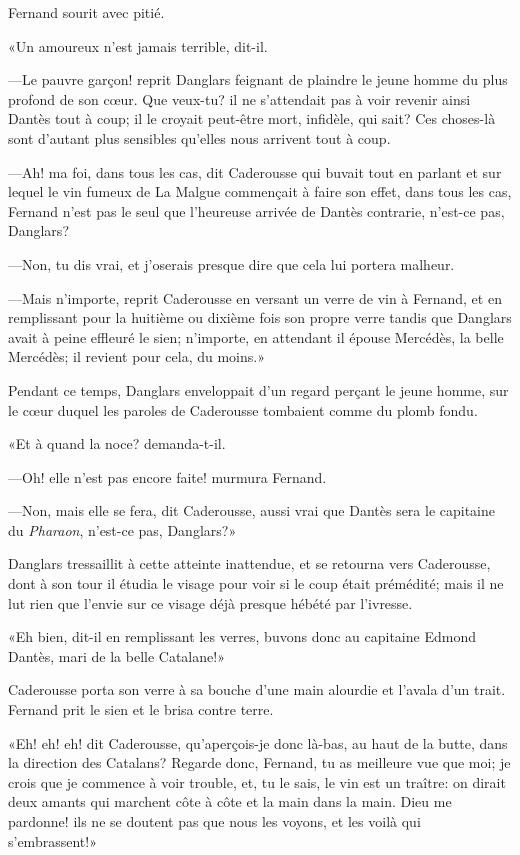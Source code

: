 Fernand sourit avec pitié.

«Un amoureux n'est jamais terrible, dit-il.

—Le pauvre garçon! reprit Danglars feignant de plaindre le jeune homme du plus profond de son cœur. Que veux-tu? il ne s'attendait pas à voir revenir ainsi Dantès tout à coup; il le croyait peut-être mort, infidèle, qui sait? Ces choses-là sont d'autant plus sensibles qu'elles nous arrivent tout à coup.

—Ah! ma foi, dans tous les cas, dit Caderousse qui buvait tout en parlant et sur lequel le vin fumeux de La Malgue commençait à faire son effet, dans tous les cas, Fernand n'est pas le seul que l'heureuse arrivée de Dantès contrarie, n'est-ce pas, Danglars?

—Non, tu dis vrai, et j'oserais presque dire que cela lui portera malheur.

—Mais n'importe, reprit Caderousse en versant un verre de vin à Fernand, et en remplissant pour la huitième ou dixième fois son propre verre tandis que Danglars avait à peine effleuré le sien; n'importe, en attendant il épouse Mercédès, la belle Mercédès; il revient pour cela, du moins.»

Pendant ce temps, Danglars enveloppait d'un regard perçant le jeune homme, sur le cœur duquel les paroles de Caderousse tombaient comme du plomb fondu.

«Et à quand la noce? demanda-t-il.

—Oh! elle n'est pas encore faite! murmura Fernand.

—Non, mais elle se fera, dit Caderousse, aussi vrai que Dantès sera le capitaine du \textit{Pharaon}, n'est-ce pas, Danglars?»

Danglars tressaillit à cette atteinte inattendue, et se retourna vers Caderousse, dont à son tour il étudia le visage pour voir si le coup était prémédité; mais il ne lut rien que l'envie sur ce visage déjà presque hébété par l'ivresse.

«Eh bien, dit-il en remplissant les verres, buvons donc au capitaine Edmond Dantès, mari de la belle Catalane!»

Caderousse porta son verre à sa bouche d'une main alourdie et l'avala d'un trait. Fernand prit le sien et le brisa contre terre.

«Eh! eh! eh! dit Caderousse, qu'aperçois-je donc là-bas, au haut de la butte, dans la direction des Catalans? Regarde donc, Fernand, tu as meilleure vue que moi; je crois que je commence à voir trouble, et, tu le sais, le vin est un traître: on dirait deux amants qui marchent côte à côte et la main dans la main. Dieu me pardonne! ils ne se doutent pas que nous les voyons, et les voilà qui s'embrassent!»

